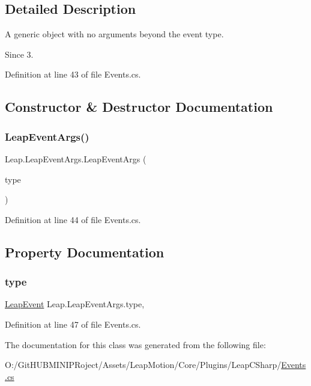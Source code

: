 \subsection{Detailed Description}
A generic object with no arguments beyond the event type. 

\begin{DoxySince}{Since}
3. 
\end{DoxySince}


Definition at line 43 of file Events.\+cs.



\subsection{Constructor \& Destructor Documentation}
\mbox{\label{class_leap_1_1_leap_event_args_afaa160ab8d03a4288bcb5355eadefade}} 
\subsubsection{\texorpdfstring{LeapEventArgs()}{LeapEventArgs()}}
{\footnotesize\ttfamily Leap.\+Leap\+Event\+Args.\+Leap\+Event\+Args (\begin{DoxyParamCaption}\item[{\mbox{\hyperlink{namespace_leap_a5b8c8df3b9ace307e29863779a4ae85d}{Leap\+Event}}}]{type }\end{DoxyParamCaption})}



Definition at line 44 of file Events.\+cs.



\subsection{Property Documentation}
\mbox{\label{class_leap_1_1_leap_event_args_ad6b72c7eb6588be538cd1f149ffcc355}} 
\subsubsection{\texorpdfstring{type}{type}}
{\footnotesize\ttfamily \mbox{\hyperlink{namespace_leap_a5b8c8df3b9ace307e29863779a4ae85d}{Leap\+Event}} Leap.\+Leap\+Event\+Args.\+type\hspace{0.3cm}{\ttfamily [get]}, {\ttfamily [set]}}



Definition at line 47 of file Events.\+cs.



The documentation for this class was generated from the following file\+:\begin{DoxyCompactItemize}
\item 
O\+:/\+Git\+H\+U\+B\+M\+I\+N\+I\+P\+Roject/\+Assets/\+Leap\+Motion/\+Core/\+Plugins/\+Leap\+C\+Sharp/\mbox{\hyperlink{_events_8cs}{Events.\+cs}}\end{DoxyCompactItemize}
